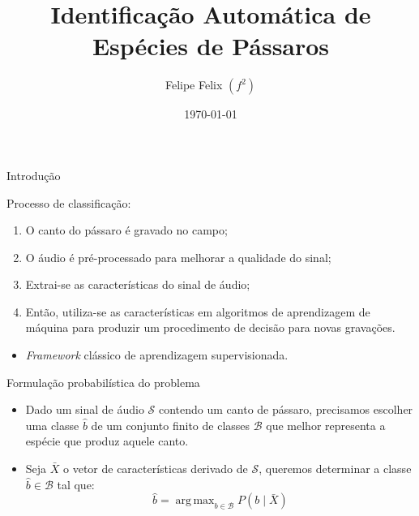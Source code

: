 \documentclass[10pt]{beamer}
\title{
Identificação Automática de Espécies de Pássaros 
}
\subtitle{}
\date{\today}
\author{Felipe Felix $(f^2)$}
\institute{IME-USP}
\DeclareMathOperator*{\argmaxA}{arg\,max} %
\begin{document}
\maketitle



\begin{frame}[fragile]{Introdução}

Processo de classificação:
\begin{enumerate}
\item O canto do pássaro é gravado no campo;
\item O áudio é pré-processado para melhorar a qualidade do sinal;
\item Extrai-se as características do sinal de áudio;
\item Então, utiliza-se as características em algoritmos
de aprendizagem de máquina para produzir um procedimento de decisão 
para novas gravações.
\end{enumerate}
\begin{itemize}
\item \textit{Framework} clássico de aprendizagem supervisionada.
\end{itemize}
\end{frame}



\begin{frame}[fragile]{Formulação probabilística do problema}
\begin{itemize}
\item Dado um sinal de áudio $\mathcal{S}$ contendo um canto de pássaro, 
precisamos escolher uma classe $\hat{b}$ de um conjunto finito de classes
$\mathcal{B}$ que melhor representa a espécie que produz aquele canto.
\item Seja $\bar{X}$ o vetor de características derivado de $\mathcal{S}$,
queremos determinar a classe $\hat{b} \in \mathcal{B}$ tal que:
\begin{equation}
\hat{b} = \argmaxA_{b \in \mathcal{B}} P(b \mid \bar{X}) 
\end{equation}


\end{itemize}
\end{frame}
\end{document}
